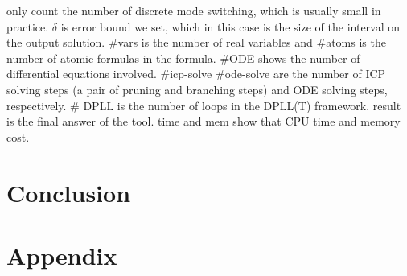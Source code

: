 \documentclass[envcountsect]{llncs}
\begin{document}
only count the number of discrete mode switching, which is usually small in
practice. {\sf $\delta$} is error bound we set, which in this case is the size
of the interval on the output solution. {\sf \#vars} is the number of real
variables and {\sf \#atoms} is the number of atomic
formulas in the formula. {\sf \#ODE} shows the number of differential equations
involved. \#{\sf icp-solve} \#{ode-solve} are the number of ICP solving steps (a
pair of pruning and branching steps) and ODE solving steps, respectively. \#{\sf
DPLL} is the number of loops in the DPLL(T) framework. {result} is the final
answer of the tool. {\sf time} and {\sf mem} show that CPU time and memory
cost. 

\section{Conclusion}








\newpage
\section*{Appendix}
\end{document}
